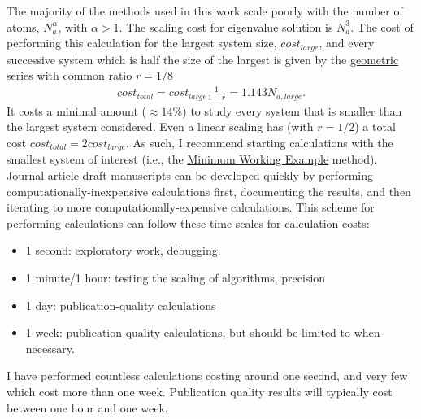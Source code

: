 The majority of the methods 
used in this work scale poorly with the number of atoms, $N_a^\alpha$, 
with $\alpha >1$. 
The scaling cost for eigenvalue solution is $N_a^3$. 
The cost of performing this calculation for the largest system size,  
$cost_{large}$,  
and every successive system which is half the size of the largest 
is given by the 
\href{http://en.wikipedia.org/wiki/Geometric_series}{geometric series} 
with common ratio $r=1/8$
\begin{equation}\label{EQ:cost_total}
\begin{split}
cost_{total} = cost_{large}\frac{1}{1-r} = 1.143N_{a,large}. 
\end{split}
\end{equation}
It costs a minimal amount ($ \approx 14\%$) to study every system that 
is smaller 
than the largest system considered. Even a linear scaling   
has (with $r=1/2$) a total cost $cost_{total} = 2cost_{large}$. 
As such, I recommend starting calculations with 
the smallest system of interest (i.e., the 
\href{http://meta.tex.stackexchange.com/questions/3300/minimum-working-example-mwe}
{Minimum Working Example} method). 
Journal article draft manuscripts can be 
developed quickly by performing computationally-inexpensive 
calculations first, documenting the results, and then iterating to more 
computationally-expensive calculations. 
This scheme for performing calculations can follow these time-scales 
for calculation costs:
\begin{itemize}
\item 1 second: exploratory work, debugging.  
\item 1 minute/1 hour: testing the scaling of algorithms, precision  
\item 1 day: publication-quality calculations
\item 1 week: publication-quality calculations, but should be limited 
to when necessary. 
\end{itemize}
I have performed 
countless calculations costing around one second, and very few which cost 
more than one week. Publication quality results will typically 
cost between one hour and one week.





